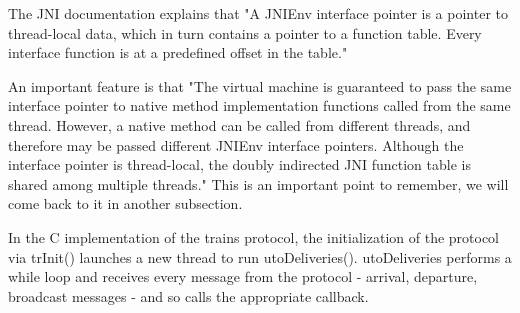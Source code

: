 \documentclass[a4paper,10pt]{report}
\begin{document}
The JNI documentation\cite{jnidoc} explains that "A JNIEnv interface pointer is a pointer to thread-local data, which in turn contains a 
pointer to a function table. Every interface function is at a predefined offset in the table."

An important feature is that "The virtual machine is guaranteed to pass the same interface pointer to native method implementation functions called from the same thread. 
However, a native method can be called from different threads, and therefore may be passed different JNIEnv interface pointers. 
Although the interface pointer is thread-local, the doubly indirected JNI function table is shared among multiple threads."
This is an important point to remember, we will come back to it in another subsection.

In the C implementation of the trains protocol, the initialization of the protocol via trInit() launches a new thread to run
utoDeliveries(). utoDeliveries performs a while loop and receives every message from the protocol - arrival, departure, broadcast messages -
and so calls the appropriate callback.\\
 
\end{document}
